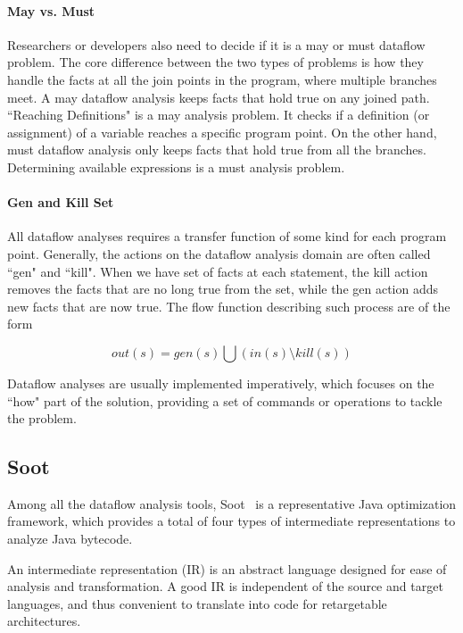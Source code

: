 \paragraph{May vs. Must} Researchers or developers also need to decide if it is a may or must dataflow problem. The core difference between the two types of problems is how they handle the facts at all the join points in the program, where multiple branches meet. A may dataflow analysis keeps facts that hold true on any joined path. ``Reaching Definitions" is a may analysis problem. It checks if a definition (or assignment) of a variable reaches a specific program point. On the other hand, must dataflow analysis only keeps facts that hold true from all the branches. Determining available expressions is a must analysis problem.

\paragraph{Gen and Kill Set} All dataflow analyses requires a transfer function of some kind for each program point. Generally, the actions on the dataflow analysis domain are often called ``gen" and ``kill". When we have set of facts at each statement, the kill action removes the facts that are no long true from the set, while the gen action adds new facts that are now true. The flow function describing such process are of the form

\begin{equation}
out(s) = gen(s) \bigcup (in(s)  \setminus  kill(s))
\end{equation}

Dataflow analyses are usually implemented imperatively, which focuses on the ``how" part of the solution, providing a set of commands or operations to tackle the problem.

\subsection{Soot}

Among all the dataflow analysis tools, Soot~\cite{Vallee-Rai:1999:SJB:781995.782008} is a representative Java optimization framework, which provides a total of four types of intermediate representations to analyze Java bytecode. 

An intermediate representation (IR) is an abstract language designed for ease of analysis and transformation. A good IR is independent of the source and target languages, and thus convenient to translate into code for retargetable architectures.

